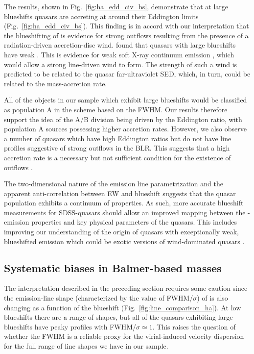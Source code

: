 The results, shown in Fig.~\ref{fig:ha_edd_civ_bs}, demonstrate that at large blueshifts quasars are accreting at around their Eddington limits (Fig.~\ref{fig:ha_edd_civ_bs}). 
This finding is in accord with our interpretation that the blueshifting of  is evidence for strong outflows resulting from the presence of a radiation-driven accretion-disc wind. 
\citet{richards02} found that quasars with large  blueshifts have weak .
This is evidence for weak soft X-ray continuum emission \citep{leighly04}, which would allow a strong line-driven wind to form.  
The strength of such a wind is predicted to be related to the quasar far-ultraviolet SED, which, in turn, could be related to the mass-accretion rate.

All of the objects in our sample which exhibit large  blueshifts would be classified as population A in the \citet{sulentic00b} scheme based on the \ha FWHM. 
Our results therefore support the idea of the \citet{sulentic00b} A/B division being driven by the Eddington ratio, with population A sources possessing higher accretion rates.
However, we also observe a number of quasars which have high Eddington ratios but do not have line profiles suggestive of strong outflows in the  BLR.  
This suggests that a high accretion rate is a necessary but not sufficient condition for the existence of outflows \citep{baskin05}. 

The two-dimensional nature of the  emission line parametrization and the apparent anti-correlation between  EW and  blueshift suggests that the quasar population exhibits a continuum of properties. 
As such, more accurate  blueshift measurements for SDSS-quasars should allow an improved mapping between the -emission properties and key physical parameters of the quasars.
This includes improving our understanding of the origin of quasars with exceptionally weak, blueshifted  emission \citep[weak emission line quasars;][]{luo15} which could be exotic versions of wind-dominated quasars \citep{plotkin15}.

\subsection{Systematic biases in Balmer-based masses}

The interpretation described in the preceding section requires some caution since the emission-line shape (characterized by the value of FWHM/$\sigma$) of \ha is also changing as a function of the  blueshift (Fig.~\ref{fig:line_comparison_ha}). 
At low  blueshifts there are a range of shapes, but all of the quasars exhibiting large  blueshifts have peaky \ha profiles with FWHM/$\sigma \simeq 1$. 
This raises the question of whether the \ha FWHM is a reliable proxy for the virial-induced velocity dispersion for the full range of \ha line shapes we have in our sample. 


